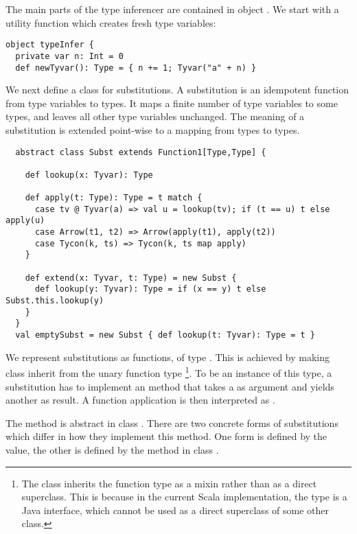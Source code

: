 {The main parts of the type inferencer are contained in object
. We start with a utility function which creates
fresh type variables:
\begin{lstlisting}
object typeInfer {
  private var n: Int = 0
  def newTyvar(): Type = { n += 1; Tyvar("a" + n) }
\end{lstlisting}
We next define a class for substitutions. A substitution is an
idempotent function from type variables to types. It maps a finite
number of type variables to some types, and leaves all other type
variables unchanged. The meaning of a substitution is extended
point-wise to a mapping from types to types.
\begin{lstlisting}
  abstract class Subst extends Function1[Type,Type] {

    def lookup(x: Tyvar): Type

    def apply(t: Type): Type = t match {
      case tv @ Tyvar(a) => val u = lookup(tv); if (t == u) t else apply(u)
      case Arrow(t1, t2) => Arrow(apply(t1), apply(t2))
      case Tycon(k, ts) => Tycon(k, ts map apply)
    }

    def extend(x: Tyvar, t: Type) = new Subst {
      def lookup(y: Tyvar): Type = if (x == y) t else Subst.this.lookup(y)
    }
  }
  val emptySubst = new Subst { def lookup(t: Tyvar): Type = t }
\end{lstlisting}
We represent substitutions as functions, of type . This is achieved by making class  inherit from the
unary function type \footnote{
The class inherits the function type as a mixin rather than as a direct 
superclass. This is because in the current Scala implementation, the
 type is a Java interface, which cannot be used as a direct
superclass of some other class.}.
To be an instance
of this type, a substitution  has to implement an 
method that takes a  as argument and yields another
 as result. A function application  is then
interpreted as .

The  method is abstract in class .  There are
two concrete forms of substitutions which differ in how they
implement this method.  One form is defined by the  value,
the other is defined by the  method in class
.

}
